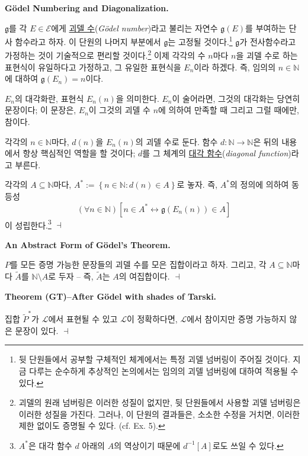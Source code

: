 \documentclass[12pt]{paper}
\newcommand{\gnum}
{ \mathfrak{g}
}
\newenvironment{context}[1][]
{ \noindent \textbf{{#1}.}
}
{ \hfill $ \dashv $
}
\begin{document}
  \begin{context}[G\"odel Numbering and Diagonalization]
    $\gnum$를 각 $E \in \mathcal{E}$에게 \underline{괴델 수}(\textit{G\"odel number})라고 불리는 자연수 $\gnum \left( E \right)$를 부여하는 단사 함수라고 하자.
    이 단원의 나머지 부분에서 $\gnum$는 고정될 것이다.\footnote
    {
      뒷 단원들에서 공부할 구체적인 체계에서는 특정 괴델 넘버링이 주어질 것이다.
      지금 다루는 순수하게 추상적인 논의에서는 임의의 괴델 넘버링에 대하여 적용될 수 있다.
    }
    $\gnum$가 전사함수라고 가정하는 것이 기술적으로 편리할 것이다.\footnote
    {
      괴델의 원래 넘버링은 이러한 성질이 없지만,
      뒷 단원들에서 사용할 괴델 넘버링은 이러한 성질을 가진다.
      그러나, 이 단원의 결과들은, 소소한 수정을 거치면,
      이러한 제한 없이도 증명될 수 있다.
      (cf. Ex. 5).
    }
    이제 각각의 수 $n$마다 $n$을 괴델 수로 하는 표현식이 유일하다고 가정하고,
    그 유일한 표현식을 $E_{n}$이라 하겠다.
    즉, 임의의 $n \in \mathbb{N}$에 대하여 $\gnum \left( E_{n} \right) = n$이다.

    $E_{n}$의 대각화란, 표현식 $E_{n} \left( n \right)$을 의미한다.
    $E_{n}$이 술어라면, 그것의 대각화는 당연히 문장이다;
    이 문장은, $E_{n}$이 그것의 괴델 수 $n$에 의하여 만족할 때 그리고 그럴 때에만, 참이다.

    각각의 $n \in \mathbb{N}$마다, $d \left( n \right)$을 $E_{n} \left( n \right)$의 괴델 수로 둔다.
    함수 $d : \mathbb{N} \to \mathbb{N}$은 뒤의 내용에서 항상 핵심적인 역할을 할 것이다;
    $d$를 그 체계의 \underline{대각 함수}(\textit{diagonal function})라고 부른다.

    각각의 $A \subseteq \mathbb{N}$마다, $A^{*} := \left\{ n \in \mathbb{N} : d \left( n \right) \in A \right\} $로 놓자.
    즉, $A^{*}$의 정의에 의하여 동등성 $$ \left( \forall n \in \mathbb{N} \right) \left[ n \in A^{*} \leftrightarrow \gnum \left( E_{n} \left( n \right) \right) \in A \right] $$이 성립한다.\footnote
    {
      $A^{*}$은 대각 함수 $d$ 아래의 $A$의 역상이기 때문에 $d^{-1} \left[ A \right]$로도 쓰일 수 있다.
    }
  \end{context}

  \begin{context}[An Abstract Form of G\"odel's Theorem]
    $P$를 모든 증명 가능한 문장들의 괴델 수를 모은 집합이라고 하자.
    그리고, 각 $A \subseteq \mathbb{N}$마다 $\tilde{A}$를 $\mathbb{N} \setminus A$로 두자 --
    즉, $\tilde{A}$는 $A$의 여집합이다.
  \end{context}

  \begin{context}[Theorem (GT)--After G\"odel with shades of Tarski]
    집합 $\tilde{P}^{*}$가 $\mathcal{L}$에서 표현될 수 있고 $\mathcal{L}$이 정확하다면,
    $\mathcal{L}$에서 참이지만 증명 가능하지 않은 문장이 있다.
  \end{context}
\end{document}
